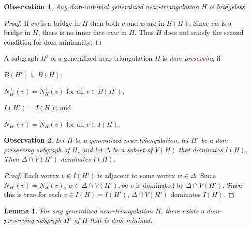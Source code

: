 \documentclass[12pt]{article}
\newtheorem{obs}{Observation}
\newtheorem{lem}{Lemma}
\newcommand{\defin}[1]{\emph{\textcolor{Maroon}{#1}}}
\begin{document}
\begin{obs}
    Any dom-minimal generalized near-triangulation $H$ is bridgeless.
\end{obs}

\begin{proof}
   If $vw$ is a bridge in $H$ then both $v$ and $w$ are in $B(H)$.  Since $vw$ is a bridge in $H$, there is no inner face $vwx$ in $H$. Thus $H$ does not satisfy the second condition for dom-minimality.
\end{proof}

A subgraph $H'$ of a generalized near-triangulation $H$ is \defin{dom-preserving} if
\begin{compactenum}[({DP}1)]
  \item $B(H')\subseteq B(H)$;
  \item $N^+_{H'}(v)=N^+_H(v)$ for all $v\in B(H')$;
  \item $I(H')=I(H)$; and
  \item $N_{H'}(v)=N_H(v)$ for all $v\in I(H)$.
\end{compactenum}

\begin{obs}
  Let $H$ be a generalized near-triangulation, let $H'$ be a dom-preserving subgraph of $H$, and let $\Delta$ be a subset of $V(H)$ that dominates $I(H)$.  Then $\Delta\cap V(H')$ dominates $I(H)$.
\end{obs}

\begin{proof}
  Each vertex $v\in I(H')$ is adjacent to some vertex $w\in \Delta$.  Since $N_{H'}(v)=N_H(v)$, $w\in\Delta\cap V(H')$, so $v$ is dominated by $\Delta\cap V(H')$.  Since this is true for each $v\in I(H)=I(H')$, $\Delta\cap V(H')$ dominates $I(H)$.
\end{proof}

\begin{lem}\label{dom-minimal}
  For any generalized near-triangulation $H$, there exists a dom-preserving subgraph $H'$ of $H$ that is dom-minimal.
\end{lem}
\end{document}
